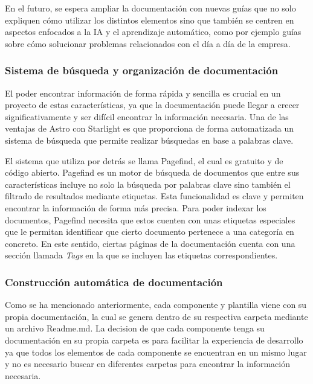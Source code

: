 En el futuro, se espera ampliar la documentación con nuevas guías
que no solo expliquen cómo utilizar los distintos elementos sino que
también se centren en aspectos enfocados a la IA y el aprendizaje
automático, como por ejemplo guías sobre cómo solucionar problemas
relacionados con el día a día de la empresa.

\subsubsection{Sistema de búsqueda y organización de documentación}
El poder encontrar información de forma rápida y sencilla es crucial
en un proyecto de estas características, ya que la documentación
puede llegar a crecer significativamente y ser difícil encontrar
la información necesaria. Una de las ventajas de Astro con Starlight
es que proporciona de forma automatizada un sistema de búsqueda 
que permite realizar búsquedas en base a palabras clave. 

El sistema que utiliza por detrás se llama Pagefind, el cual es gratuito 
y de código abierto. Pagefind es un motor de búsqueda de documentos
que entre sus características incluye no solo la búsqueda por palabras
clave sino también el filtrado de resultados mediante etiquetas. Esta 
funcionalidad es clave y permiten encontrar la información de forma más precisa. 
Para poder indexar los documentos, Pagefind necesita que estos cuenten con
unas etiquetas especiales que le permitan identificar que cierto documento
pertenece a una categoría en concreto. En este sentido, ciertas páginas
de la documentación cuenta con una sección llamada \textit{Tags} en la que
se incluyen las etiquetas correspondientes.


\subsubsection{Construcción automática de documentación}
Como se ha mencionado anteriormente, cada componente y plantilla 
viene con su propia documentación, la cual se genera dentro de su
respectiva carpeta mediante un archivo Readme.md. La decision de 
que cada componente tenga su documentación en su propia carpeta
es para facilitar la experiencia de desarrollo ya que todos los
elementos de cada componente se encuentran en un mismo lugar y no
es necesario buscar en diferentes carpetas para encontrar la
información necesaria.

